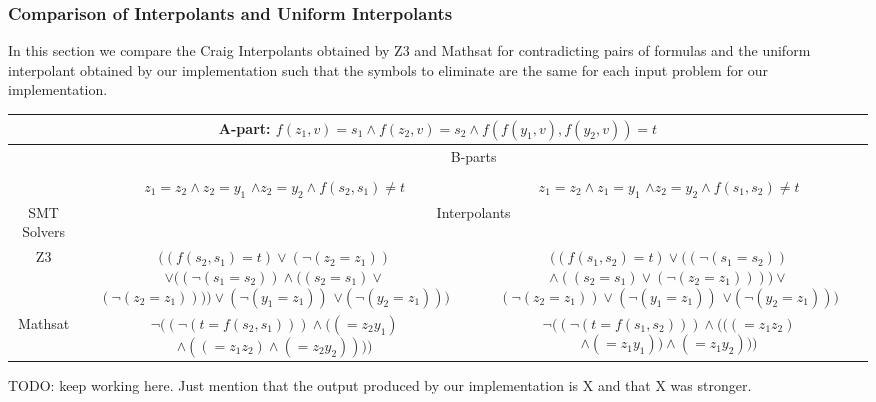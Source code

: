 \subsubsection{Comparison of Interpolants and Uniform Interpolants}

In this section we compare the Craig Interpolants obtained by Z3 and Mathsat for contradicting pairs of formulas and the uniform interpolant obtained by our implementation such
that the symbols to eliminate are the same
for each input problem for our implementation.

\begin{table}[h]
\centering
\begin{tabular}{ccc}
\toprule
\multicolumn{3}{c}{A-part: $f(z_1, v) = s_1 \land f(z_2, v) = s_2 \land f(f(y_1, v), f(y_2, v)) = t$} \\
\midrule 
{} & \multicolumn{2}{c}{B-parts} \\
\cmidrule{2-3} \\
{} & 
\makecell{$z_1 = z_2 \land z_2 = y_1$ \\ $\land z_2 = y_2 \land f(s_2, s_1) \neq t$} & 
\makecell{$z_1 = z_2 \land z_1 = y_1$ \\ $\land z_2 = y_2 \land f(s_1, s_2) \neq t$} \\
\midrule
\multirow{1}{*}{SMT Solvers} & \multicolumn{2}{c}{Interpolants} \\
\midrule
Z3 & 
\makecell{$((f(s_2, s_1) = t) \lor (\neg (z_2 = z_1))$ \\ $\lor ((\neg (s_1 = s_2)) \land ((s_2 = s_1) \lor$ \\ $(\neg (z_2 = z_1)))) \lor (\neg (y_1 = z_1))$ \\ $\lor (\neg (y_2 = z_1)))$} & 
\makecell{$((f(s_1, s_2) = t) \lor ((\neg (s_1 = s_2))$ \\ $\land ((s_2 = s_1) \lor (\neg (z_2 = z_1)))) \lor$ \\ $(\neg (z_2 = z_1)) \lor (\neg (y_1 = z_1))$ \\ $\lor (\neg (y_2 = z_1)))$} \\
\midrule
Mathsat & 
\makecell{$\neg ((\neg (t = f(s_2, s_1))) \land ((= z_2 y_1)$ \\ $\land ((= z_1 z_2) \land (= z_2 y_2))))$} & 
\makecell{$\neg ((\neg (t = f(s_1, s_2))) \land (((= z_1 z_2)$ \\ $ \land (= z_1 y_1)) \land (= z_1 y_2)))$}\\
\bottomrule
\end{tabular}
\end{table}

TODO: keep working here. Just mention that the output produced by our implementation is X and that X was stronger.

